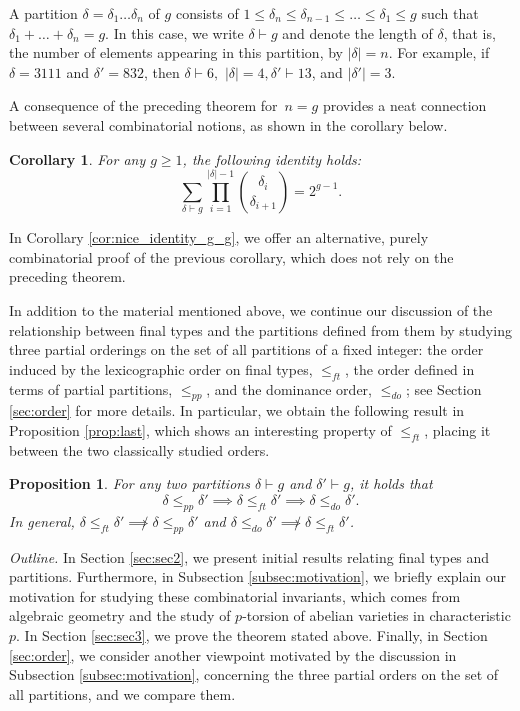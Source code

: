 \documentclass[11pt]{amsart}
\numberwithin{equation}{section}
\theoremstyle{plain}
\newcommand{\<}{\left \langle}
\renewcommand{\>}{\right \rangle}
\newtheorem*{cor*}{Corollary}
\newtheorem*{prop*}{Proposition}
\theoremstyle{definition}
\theoremstyle{remark}
\begin{document}
A partition $\delta = \delta_1\ldots \delta_n$ of $g$ consists of $1 \leq \delta_n \leq \delta_{n - 1} \leq \ldots \leq \delta_1 \leq g$ such that $\delta_1 + \ldots + \delta_n = g$. In this case, we write $\delta \vdash g$ and denote the length of $\delta$, that is, the number of elements appearing in this partition, by $|\delta| = n$. For example, if $\delta = 3111$ and $\delta' = 832$, then $\delta \vdash 6,$ $|\delta| = 4, \delta' \vdash 13$, and $|\delta'| = 3$.

A consequence of the preceding theorem for~${n = g}$ provides a neat connection between several combinatorial notions, as shown in the corollary below.

\begin{cor*} For any $g \geq 1$, the following identity holds: 
$$\sum_{\delta \vdash g} \prod_{i = 1}^{|\delta| - 1} {\delta_i \choose \delta_{i + 1}} = 2^{g - 1}.$$
\end{cor*}
\noindent
In Corollary \ref{cor:nice_identity_g_g}, we offer an alternative, purely combinatorial proof of the previous corollary, which does not rely on the preceding theorem.

In addition to the material mentioned above, we continue our discussion of the relationship between final types and the partitions defined from them by studying three partial orderings on the set of all partitions of a fixed integer: the order induced by the lexicographic order on final types, $\leq_{ft}$, the order defined in terms of partial partitions, $\leq_{pp}$, and the dominance order, $\leq_{do}$; see Section \ref{sec:order} for more details. In particular, we obtain the following result in Proposition \ref{prop:last}, which shows an interesting property of $\leq_{ft}$, placing it between the two classically studied orders.

\begin{prop*} For any two partitions $\delta \vdash g$ and $\delta' \vdash g$, it holds that $$\delta \leq_{pp} \delta' \implies \delta \leq_{ft} \delta' \implies \delta \leq_{do} \delta'.$$
In general, $\delta \leq_{ft} \delta' \not \implies \delta \leq_{pp} \delta'$ and $\delta \leq_{do} \delta' \not \implies \delta \leq_{ft} \delta'$.
\end{prop*}

\emph{Outline.} In Section \ref{sec:sec2}, we present initial results relating final types and partitions. Furthermore, in Subsection \ref{subsec:motivation}, we briefly explain our motivation for studying these combinatorial invariants, which comes from algebraic geometry and the study of $p$-torsion of abelian varieties in characteristic $p$. In Section \ref{sec:sec3}, we prove the theorem stated above. Finally, in Section \ref{sec:order}, we consider another viewpoint motivated by the discussion in Subsection \ref{subsec:motivation}, concerning the three partial orders on the set of all partitions, and we compare them.
\end{document}
